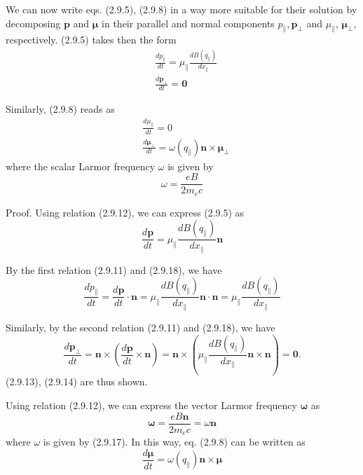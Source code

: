 \documentclass{article}
\begin{document}
We can now write eqs. (2.9.5), (2.9.8) in a way more suitable for their solution by decomposing $\boldsymbol{p}$ and $\boldsymbol{\mu}$ in their parallel and normal components $p_{\|}, \boldsymbol{p}_{\perp}$ and $\mu_{\|}$, $\boldsymbol{\mu}_{\perp}$, respectively. (2.9.5) takes then the form
$$
\begin{align*}
& \frac{d p_{\|}}{d t}=\mu_{\|} \frac{d B\left(q_{\|}\right)}{d x_{\|}}  \tag{2.9.13}\\
& \frac{d \boldsymbol{p}_{\perp}}{d t}=\mathbf{0} \tag{2.9.14}
\end{align*}
$$

Similarly, (2.9.8) reads as
$$
\begin{align*}
& \frac{d \mu_{\|}}{d t}=0  \tag{2.9.15}\\
& \frac{d \boldsymbol{\mu}_{\perp}}{d t}=\omega\left(q_{\|}\right) \boldsymbol{n} \times \boldsymbol{\mu}_{\perp} \tag{2.9.16}
\end{align*}
$$
where the scalar Larmor frequency $\omega$ is given by
$$
\begin{equation*}
\omega=\frac{e B}{2 m_{e} c} \tag{2.9.17}
\end{equation*}
$$

Proof. Using relation (2.9.12), we can express (2.9.5) as
$$
\begin{equation*}
\frac{d \boldsymbol{p}}{d t}=\mu_{\|} \frac{d B\left(q_{\|}\right)}{d x_{\|}} \boldsymbol{n} \tag{2.9.18}
\end{equation*}
$$

By the first relation (2.9.11) and (2.9.18), we have
$$
\begin{equation*}
\frac{d p_{\|}}{d t}=\frac{d \boldsymbol{p}}{d t} \cdot \boldsymbol{n}=\mu_{\|} \frac{d B\left(q_{\|}\right)}{d x_{\|}} \boldsymbol{n} \cdot \boldsymbol{n}=\mu_{\|} \frac{d B\left(q_{\|}\right)}{d x_{\|}} \tag{2.9.19}
\end{equation*}
$$

Similarly, by the second relation (2.9.11) and (2.9.18), we have
$$
\begin{equation*}
\frac{d \boldsymbol{p}_{\perp}}{d t}=\boldsymbol{n} \times\left(\frac{d \boldsymbol{p}}{d t} \times \boldsymbol{n}\right)=\boldsymbol{n} \times\left(\mu_{\|} \frac{d B\left(q_{\|}\right)}{d x_{\|}} \boldsymbol{n} \times \boldsymbol{n}\right)=\mathbf{0} . \tag{2.9.20}
\end{equation*}
$$
(2.9.13), (2.9.14) are thus shown.

Using relation (2.9.12), we can express the vector Larmor frequency $\boldsymbol{\omega}$ as
$$
\begin{equation*}
\boldsymbol{\omega}=\frac{e B \boldsymbol{n}}{2 m_{e} c}=\omega \boldsymbol{n} \tag{2.9.21}
\end{equation*}
$$
where $\omega$ is given by (2.9.17). In this way, eq. (2.9.8) can be written as
$$
\begin{equation*}
\frac{d \boldsymbol{\mu}}{d t}=\omega\left(q_{\|}\right) \boldsymbol{n} \times \boldsymbol{\mu} \tag{2.9.22}
\end{equation*}
$$
\end{document}
